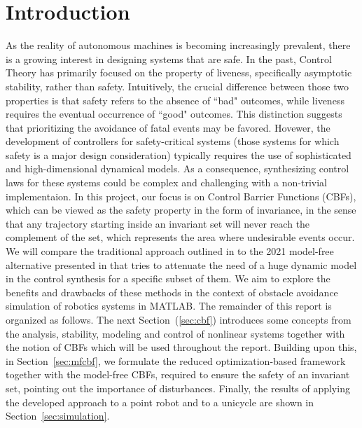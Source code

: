 \section*{Introduction}
As the reality of autonomous machines is becoming increasingly prevalent, there is a growing interest in designing systems that are safe. In the past, Control Theory has primarily focused on the property of liveness, specifically asymptotic stability, rather than safety.
Intuitively, the crucial difference between those two properties is  that safety refers to the absence of ``bad" outcomes, while liveness requires the eventual occurrence of ``good" outcomes. This distinction suggests that prioritizing the avoidance of fatal events may be favored.
Hovewer, the development of controllers for safety-critical systems (those systems for which safety is a major design consideration) typically requires the use of sophisticated and high-dimensional dynamical models. As a consequence, synthesizing control laws for these systems could be complex and challenging  with a non-trivial implementaion. 
In this project, our focus is on Control Barrier Functions (CBFs), which can be viewed as the safety property in the form of invariance, in the sense that any trajectory starting inside an invariant set will never reach the complement of the set, which represents the area where undesirable events occur. 
We will compare the traditional approach outlined in \cite{cbf} to the 2021 model-free alternative presented in \cite{mfcbf} that tries to attenuate the need of a huge dynamic model in the control synthesis for a specific subset of them. We aim to explore the benefits and drawbacks of these methods in the context of obstacle avoidance simulation of robotics systems in MATLAB.
The remainder of this report is organized as follows. The next Section~(\ref{sec:cbf}) introduces some concepts from the analysis, stability, modeling and control of nonlinear systems together with the notion of CBFs which will be used throughout the report. %
Building upon this, in Section~\ref{sec:mfcbf}, we formulate the reduced optimization-based framework together with the model-free CBFs, required to ensure the safety of an invariant set, pointing out the importance of disturbances. Finally, the results of applying the developed approach to a point robot and to a unicycle are shown in Section~\ref{sec:simulation}.


